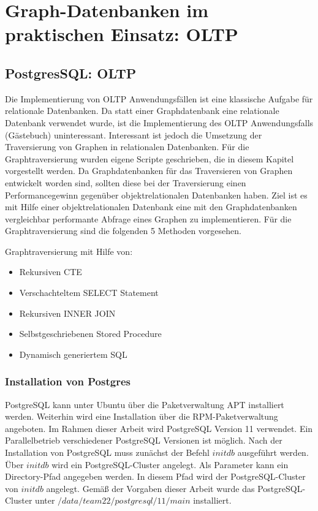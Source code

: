 \chapter{Graph-Datenbanken im praktischen Einsatz: \ac{OLTP}}
\section{PostgresSQL: OLTP}
Die Implementierung von OLTP Anwendungsfällen ist eine klassische Aufgabe für relationale Datenbanken.
Da statt einer Graphdatenbank eine relationale Datenbank verwendet wurde, ist die Implementierung des OLTP Anwendungsfalls (Gästebuch) uninteressant.
Interessant ist jedoch die Umsetzung der Traversierung von Graphen in relationalen Datenbanken.
Für die Graphtraversierung wurden eigene Scripte geschrieben, die in diesem Kapitel vorgestellt werden.
Da Graphdatenbanken für das Traversieren von Graphen entwickelt worden sind, sollten diese bei der Traversierung einen Performancegewinn gegenüber objektrelationalen Datenbanken haben.
Ziel ist es mit Hilfe einer objektrelationalen Datenbank eine mit den Graphdatenbanken vergleichbar performante Abfrage eines Graphen zu implementieren.
Für die Graphtraversierung sind die folgenden 5 Methoden vorgesehen.

Graphtraversierung mit Hilfe von:
\begin{itemize}
    \item Rekursiven \ac{CTE}
    \item Verschachteltem SELECT Statement
    \item Rekursiven INNER JOIN
    \item Selbstgeschriebenen Stored Procedure
    \item Dynamisch generiertem \ac{SQL}
\end{itemize}
\subsection{Installation von Postgres}
PostgreSQL kann unter Ubuntu über die Paketverwaltung \ac{APT} installiert werden.
Weiterhin wird eine Installation über die \ac{RPM}-Paketverwaltung angeboten.
Im Rahmen dieser Arbeit wird PostgreSQL Version 11 verwendet.
Ein Parallelbetrieb verschiedener PostgreSQL Versionen ist möglich.
Nach der Installation von PostgreSQL muss zunächst der Befehl $initdb$ ausgeführt werden.
Über $initdb$ wird ein PostgreSQL-Cluster angelegt.
Als Parameter kann ein Directory-Pfad angegeben werden.
In diesem Pfad wird der PostgreSQL-Cluster von $initdb$ angelegt.
Gemäß der Vorgaben dieser Arbeit wurde das PostgreSQL-Cluster unter $/data/team22/postgresql/11/main$ installiert.

